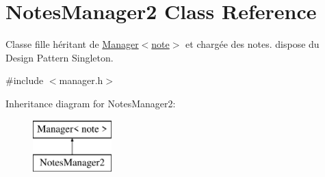 \hypertarget{class_notes_manager2}{}\section{Notes\+Manager2 Class Reference}
\label{class_notes_manager2}


Classe fille héritant de \hyperlink{class_manager}{Manager$<$note$>$} et chargée des notes. dispose du Design Pattern Singleton.  




{\ttfamily \#include $<$manager.\+h$>$}

Inheritance diagram for Notes\+Manager2\+:\begin{figure}[H]
\begin{center}
\leavevmode
\includegraphics[height=2.000000cm]{class_notes_manager2}
\end{center}
\end{figure}
